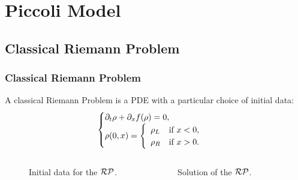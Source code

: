 \section{Piccoli Model}
\subsection{Classical Riemann Problem}
\begin{frame}
	\frametitle{Classical Riemann Problem}
A classical Riemann Problem is a PDE with a particular choice of initial data:
\begin{equation}
        \label{eq:RP}
	\begin{cases}
		\partial_t \rho + \partial_x f(\rho) =0, \\
		\rho(0,x) = \left\{
		\begin{array}{ll}
			\rho_L &\hbox{if}~x<0, \\
			\rho_R &\hbox{if}~x>0.
		\end{array}
		\right. 
	\end{cases}
\end{equation}
\begin{columns}
	\begin{figure}[ht]
\centering

\caption{Initial data for the $\mathcal{RP}$.}
\label{fig:initialData}
\end{figure}
	\pause
	\begin{figure}[ht]
\centering

\caption{Solution of the $\mathcal{RP}$.}
\label{fig:RPsolution}
\end{figure}
	\end{columns}
\end{frame}

